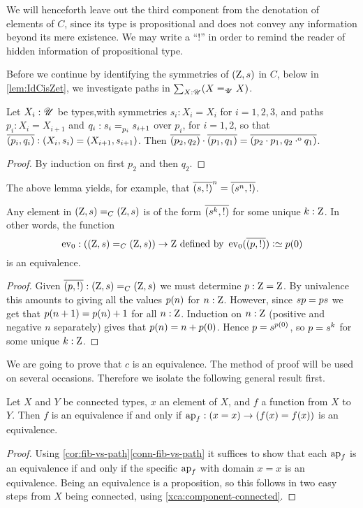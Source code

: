 We will henceforth leave out the third component from the denotation
of elements of $C$, since its type is propositional and does not convey 
any information beyond its mere existence. We may write a ``!'' in order
to remind the reader of hidden information of propositional type.

Before we continue by identifying the symmetries of $(\mathrm{Z},{s})$ in $C$,
below in \cref{lem:IdCisZet}, we investigate paths in $\sum_{X:{\mathscr{U}}}(X=_{{\mathscr{U}}}X)$.

\begin{lemma}\label{lem:path-in-sum-X:U-X=X}
Let $X_i:{\mathscr{U}}$ be types,with symmetries $s_i: X_i = X_i$ for $i=1,2,3$, and 
paths $p_i : X_i = X_{i+1}$ and $q_i : \pathover {s_i}{}{p_i}{s_{i+1}}$ over $p_i$, 
for $i=1,2$, so that $\overline{({p_i},{q_i})} : (X_i,s_i) = (X_{i+1},s_{i+1})$.
Then $\overline{({p_2},{q_2})} \cdot \overline{({p_1},{q_1})} = \overline{({p_2 \cdot p_1},{q_2 \cdot^{\mathrm{o}} q_1})} $.
\end{lemma}
\begin{proof}
By induction on first $p_2$ and then $q_2$.
\end{proof}

The above lemma yields, for example, that $\overline{({{s}},{!})} ^n = \overline{({{s}^n},{!})}$.

\begin{lemma}
  \label{lem:IdCisZet}
Any element in $(\mathrm{Z},{s})=_C(\mathrm{Z},{s})$ is of 
the form $\overline{({{s}^k},{!})}$ for some unique $k:\mathrm{Z}$.  
In other words, the function 
\[
\ev_0:((\zet,\etop{s})=_C(\zet,\etop{s}))\to \zet 
\text{~defined by~} \ev_0(\pathpair{p}{!}) \defeq \ptoe{p}(0)
\]
is an equivalence.
\end{lemma}
\begin{proof}
  Given $\overline{({p},{!})}:(\mathrm{Z},{s})=_C(\mathrm{Z},{s})$ we must determine 
$p:\mathrm{Z}=\mathrm{Z}$. By univalence this amounts to giving all the values 
${p}(n)$ for $n:\mathrm{Z}$.  However, since $s{p}={p}s$ we 
get that ${p}(n+1)={p}(n)+1$ for all $n:\mathrm{Z}$. 
Induction on $n:\mathrm{Z}$ (positive and negative $n$ separately) gives that 
${p}(n)=n+{p}(0)$. Hence ${p}=s^{{p}(0)}$, so $p={s}^k$
for some unique $k:\mathrm{Z}$.
\end{proof}

We are going to prove that $c$ is an equivalence.
The method of proof will be used on several occasions.
Therefore we isolate the following general result first.

\begin{lemma}\label{lem:conn-eq-f-ap-f-x}
Let $X$ and $Y$ be connected types, $x$ an element of $X$,
and $f$ a function from $X$ to $Y$. Then $f$ is an equivalence
if and only if $\ap{f}: (x=x) \to (f(x)=f(x))$ is an equivalence.
\end{lemma} 
\begin{proof}
Using \cref{cor:fib-vs-path}\ref{conn-fib-vs-path} it suffices to show that 
each $\ap{f}$ is an equivalence if and only if the specific $\ap{f}$ with 
domain $x=x$ is an equivalence. Being an equivalence is a proposition, 
so this follows in two easy steps from $X$ being connected,
using \cref{xca:component-connected}.
\end{proof}

